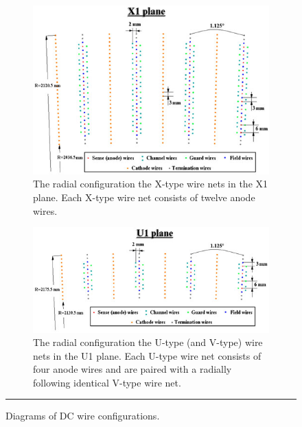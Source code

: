 \begin{figure}
    \ContinuedFloat %
\begin{subfigure}[p]{1\textwidth}
  \centering
    \includegraphics[width=1\textwidth]{Figures/DCX1net.jpg}

  \caption{The radial configuration the X-type wire nets in the X1 plane. Each X-type wire net consists of twelve anode wires.}
  \label{fig:X1dcdiagram}
\end{subfigure}

\begin{subfigure}[p]{1\textwidth}
  \centering
    \includegraphics[width=1\textwidth]{Figures/DCU1net.jpg}
    
  \caption{The radial configuration the U-type (and V-type) wire nets in the U1 plane. Each U-type wire net consists of four anode wires and are paired with a radially following identical V-type wire net.}
  \label{fig:U1dcdiagram}
\end{subfigure}
\rule{35em}{0.5pt}
\caption[Diagrams of DC wire configurations.]{Diagrams of DC wire configurations.}
\label{fig:dcdiagram}
\end{figure}
